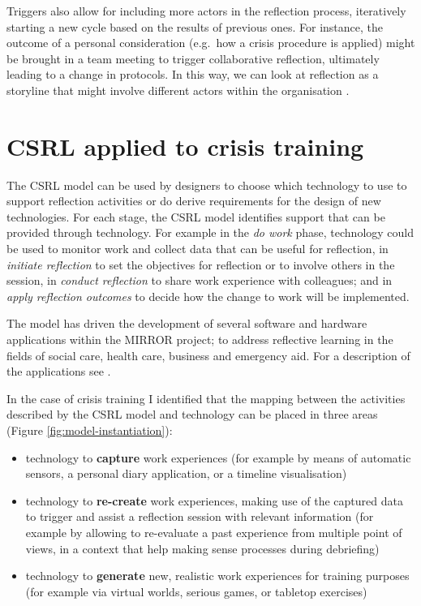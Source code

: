 Triggers also allow for including more actors in the reflection process, iteratively starting a new cycle based on the results of previous ones. For instance, the outcome of a personal consideration (e.g.~how a crisis procedure is applied) might be brought in a team meeting to trigger collaborative reflection, ultimately leading to a change in protocols. In this way, we can look at reflection as a storyline that might involve different actors within the organisation \autocite{PrPK13}.

\section{CSRL applied to crisis training}\label{csrl-applied-to-the-design-of-technology-for-crisis-training}

The CSRL model can be used by designers to choose which technology to use to support reflection activities or do derive requirements for the design of new technologies. For each stage, the CSRL model identifies support that can be provided through technology. For example in the \emph{do work} phase, technology could be used to monitor work and collect data that can be useful for reflection, in \emph{initiate reflection} to set the objectives for reflection or to involve others in the session, in \emph{conduct reflection} to share work experience with colleagues; and in \emph{apply reflection outcomes} to decide how the change to work will be implemented.

The model has driven the development of several software and hardware applications within the MIRROR project; to address reflective learning in the fields of social care, health care, business and emergency aid. For a description of the applications see \autocite{Schwantzer:2014we}. 

In the case of crisis training I identified that the mapping between the activities described by the CSRL model and technology can be placed in three areas (Figure \ref{fig:model-instantiation}):
\begin{itemize}
	\itemsep1pt\parskip0pt 
	\item technology to \textbf{capture} work experiences (for example by means of automatic sensors, a personal diary application, or a timeline visualisation) 
	\item technology to \textbf{re-create} work experiences, making use of the captured data to trigger and assist a reflection session with relevant information (for example by allowing to re-evaluate a past experience from multiple point of views, in a context that help making sense processes during debriefing) 
	\item technology to \textbf{generate} new, realistic work experiences for training purposes (for example via virtual worlds, serious games, or tabletop exercises) 
\end{itemize}

